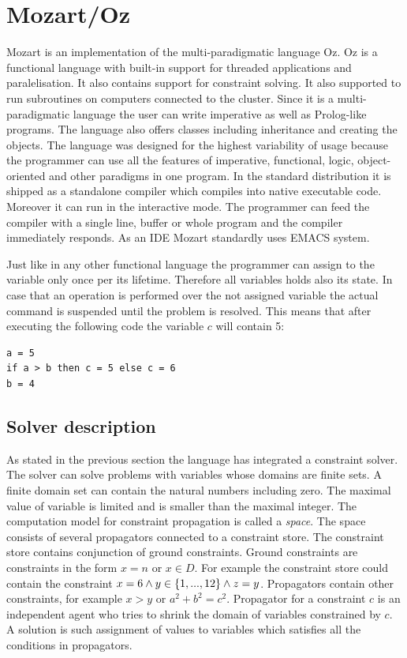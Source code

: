 \section{Mozart/Oz}

Mozart is an implementation of the multi-paradigmatic language Oz. Oz is a functional
language with built-in support for threaded applications and paralelisation. It also
contains support for constraint solving. It also supported to run subroutines on computers
connected to the cluster. Since it is a multi-paradigmatic language the user
can write imperative as well as Prolog-like programs. The language also offers classes
including inheritance and creating the objects. The language was designed for the
highest variability of usage because the programmer can use all the features of imperative,
functional, logic, object-oriented and other paradigms in one program. In the standard distribution
it is shipped as a standalone compiler which compiles into native executable code.
Moreover it can run in the interactive mode. The programmer can feed the compiler with
a single line, buffer or whole program and the compiler immediately responds. As an IDE
Mozart standardly uses EMACS system.

Just like in any other functional language the programmer can assign to the variable 
only once per its lifetime. Therefore all variables holds also its state. In case that
an operation is performed over the not assigned variable the actual command is suspended
until the problem is resolved. This means that after executing the following code the
variable $c$ will contain 5:

\begin{verbatim}
a = 5
if a > b then c = 5 else c = 6
b = 4
\end{verbatim}

\subsection{Solver description}
As stated in the previous section the language has integrated a constraint solver. The solver
can solve problems with variables whose domains are finite sets. A finite domain
set can contain the natural numbers including zero. The maximal value of variable is limited and is smaller 
than the maximal integer. The computation model for constraint propagation is called 
a {\em space}. The space consists of several propagators connected to a constraint store.
The constraint store contains conjunction of ground constraints. Ground constraints
are constraints in the form $x=n$ or $x \in D$. For example the constraint store could
contain the constraint $x = 6 \wedge y \in \{1, ..., 12\} \wedge z = y$. Propagators contain
other constraints, for example $x>y$ or $a^2 + b^2 = c^2$. Propagator for a constraint
 $c$ is an independent agent who tries to shrink the domain of variables constrained
 by $c$. A solution is such  assignment of values to variables which satisfies all the conditions
 in propagators.
 
